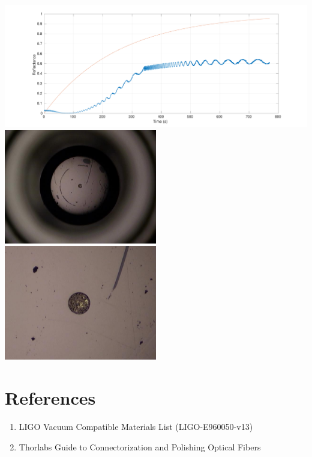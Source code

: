 \documentclass{article}
\begin{document}
\includegraphics[width=\textwidth]{BS_Coating_Fiber_Time.pdf}
\includegraphics[width=0.5\textwidth]{GoldFiberTip.JPG}
\includegraphics[width=0.5\textwidth]{GoldFiberTipZoom.JPG}
\section{References}
\begin{enumerate}
\item LIGO Vacuum Compatible Materials List (LIGO-E960050-v13)
\item Thorlabs Guide to Connectorization and Polishing Optical Fibers 
\end{enumerate}
\end{document}
